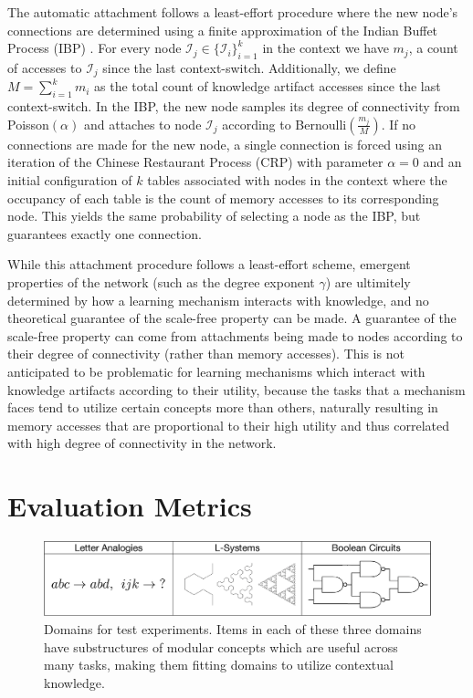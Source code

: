 \documentclass[11pt,letterpaper]{article}
\begin{document}
The automatic attachment follows a least-effort procedure where the new
node's connections are determined using a finite approximation of the Indian
Buffet Process (IBP) \cite{griffiths11}. For every node
$\mathcal{I}_j\in\{\mathcal{I}_i\}_{i=1}^k$ in the context we have $m_j$, a
count of accesses to $\mathcal{I}_j$ since the last context-switch.
Additionally, we define $M=\sum_{i=1}^km_i$ as the total count of knowledge
artifact accesses since the last context-switch. In the IBP, the new node
samples its degree of connectivity from Poisson$(\alpha)$ and attaches to
node $\mathcal{I}_j$ according to Bernoulli$\left(\frac{m_j}{M}\right)$.
If no connections are made for the new node, a single connection is forced
using an iteration of the Chinese Restaurant Process (CRP) with parameter
$\alpha=0$ and an initial configuration of $k$ tables associated with nodes
in the context where the occupancy of each table is the count of memory
accesses to its corresponding node. This yields the same probability of
selecting a node as the IBP, but guarantees exactly one connection.

While this attachment procedure follows a least-effort scheme, emergent
properties of the network (such as the degree exponent $\gamma$) are
ultimitely determined by how a learning mechanism interacts with knowledge,
and no theoretical guarantee of the scale-free property can be made. A
guarantee of the scale-free property can come from attachments being made to
nodes according to their degree of connectivity (rather than memory
accesses). This is not anticipated to be problematic for learning mechanisms
which interact with knowledge artifacts according to their utility, because
the tasks that a mechanism faces tend to utilize certain concepts more than
others, naturally resulting in memory accesses that are proportional to
their high utility and thus correlated with high degree of connectivity in
the network.

\section{Evaluation Metrics}

\begin{figure}[h]
\centering
\includegraphics[scale=.5]{exps.eps}
\caption{Domains for test experiments. Items in each of these three domains
  have substructures of modular concepts which are useful across many tasks,
  making them fitting domains to utilize contextual knowledge.}
\label{fig:exps}
\end{figure}
\end{document}
